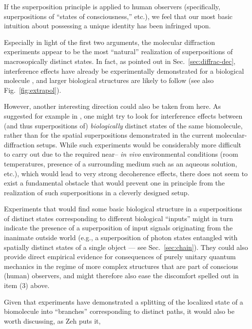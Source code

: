 \documentclass[twocolumn,aps,floatfix,amsmath,amssymb,showpacs,nofootinbib]{revtex4}
\begin{document}
\item If the superposition principle is applied to human observers
  (specifically, superpositions of ``states of consciousness,'' etc.),
  we feel that our most basic intuition about possessing a unique
  identity has been infringed upon.
  
\en
  
Especially in light of  the first two arguments, the molecular
diffraction experiments appear to be the most ``natural'' realization
of superpositions of macrosopically distinct states. In fact, as
pointed out in Sec.~\ref{sec:diffrac-dec}, interference effects have
already be experimentally demonstrated for a biological molecule
\cite{Hackermueller:2002:wb}, and larger biological structures are
likely to follow \cite{Arndt:2002:bo,Hackermuller:2003:uu} (see also
Fig.~\ref{fig:extrapol}).

However, another interesting direction could also be taken from here.
As suggested for example in
\cite{Shimony:1998:yy,Leggett:2002:uy}, one might try to look
for interference effects between (and thus superpositions of) {\em
  biologically} distinct states of the same biomolecule, rather than
for the spatial superpositions demonstrated in the current
molecular-diffraction setups. While such experiments would be
considerably more difficult to carry out due to the required near--{\em
  in vivo} environmental conditions (room temperatures, presence of a
surrounding medium such as an aqueous solution, etc.), which would lead to very
strong decoherence effects, there does not seem to exist a fundamental
obstacle that would prevent one in principle from the realization of
such superpositions in a cleverly designed setup.

Experiments that would find some basic biological structure in a
superpositions of distinct states corresponding to different
biological ``inputs'' might in turn indicate the presence of a
superposition of input signals originating from the inanimate outside
world (e.g., a superposition of photon states entangled with spatially
distinct states of a single object --- see Sec.~\ref{sec:chain}).
They could also provide direct empirical evidence for consequences of
purely unitary quantum mechanics in the regime of more complex
structures that are part of conscious (human) observers, and might
therefore also ease the discomfort spelled out in item (3) above.

Given that experiments \cite{Hackermueller:2002:wb} have demonstrated
a splitting of the localized state of a biomolecule into ``branches''
corresponding to distinct paths, it would also be 
worth discussing, as Zeh \cite{Zeh:2000:rr} puts it,
\end{document}

